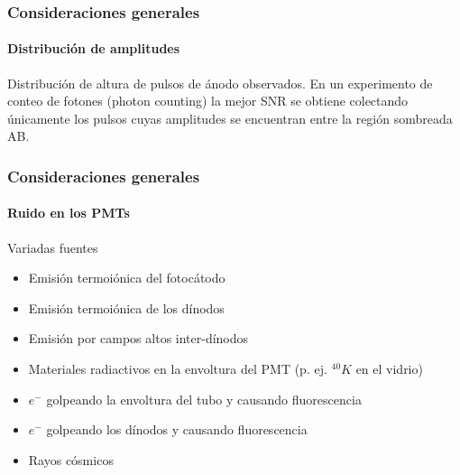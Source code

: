 \documentclass{beamer}
\begin{document}
\begin{frame}
\frametitle{Consideraciones generales}
\framesubtitle{Distribución de amplitudes}
\begin{center}
\end{center}
Distribución de altura de pulsos de ánodo observados. En un experimento de
conteo de fotones (photon counting) la mejor SNR se obtiene colectando
únicamente los pulsos cuyas amplitudes se encuentran entre la región sombreada
AB.  
\end{frame}

\begin{frame}
\frametitle{Consideraciones generales}
\framesubtitle{Ruido en los PMTs}
\begin{block}{Variadas fuentes}
\begin{itemize}
\item Emisión termoiónica del fotocátodo
\item Emisión termoiónica de los dínodos
\item Emisión por campos altos inter-dínodos
\item Materiales radiactivos en la envoltura del PMT (p. ej. $^{40}K$ en el
vidrio) 
\item $e^-$ golpeando la envoltura del tubo y causando fluorescencia 
\item $e^-$ golpeando los dínodos y causando fluorescencia 
\item Rayos cósmicos
\end{itemize}
\end{block}
\end{frame}
\end{document}
